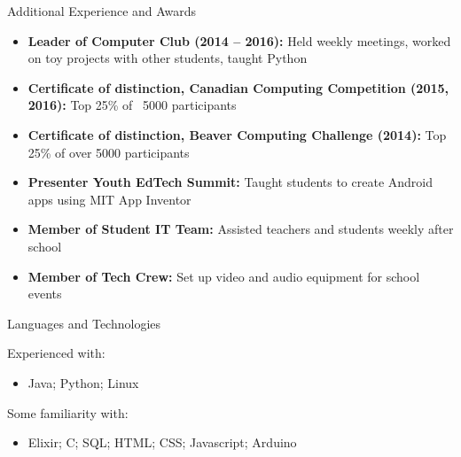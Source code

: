 \documentclass[]{mcdowellcv}
\begin{document}
	\begin{cvsection}{Additional Experience and Awards}
		\begin{cvsubsection}{}{}{}
			\begin{itemize}
				\item \textbf{Leader of Computer Club (2014 – 2016):} Held weekly meetings, worked on toy projects with other students, taught Python
				\item \textbf{Certificate of distinction, Canadian Computing Competition (2015, 2016):} Top 25\% of ~5000 participants
				\item \textbf{Certificate of distinction, Beaver Computing Challenge (2014):} Top 25\% of over 5000 participants
				\item \textbf{Presenter Youth EdTech Summit:} Taught students to create Android apps using MIT App Inventor
				\item \textbf{Member of Student IT Team:} Assisted teachers and students weekly after school
				\item \textbf{Member of Tech Crew:} Set up video and audio equipment for school events
			\end{itemize}
		\end{cvsubsection}
	\end{cvsection}

	\begin{cvsection}{Languages and Technologies}
		\begin{cvsubsection}{}{}{}
            Experienced with:
			\begin{itemize}
				\item Java; Python; Linux
            \end{itemize}
            Some familiarity with:
            \begin{itemize}
                \item Elixir; C; SQL; HTML; CSS; Javascript; Arduino
			\end{itemize}
		\end{cvsubsection}
	\end{cvsection}
\end{document}
